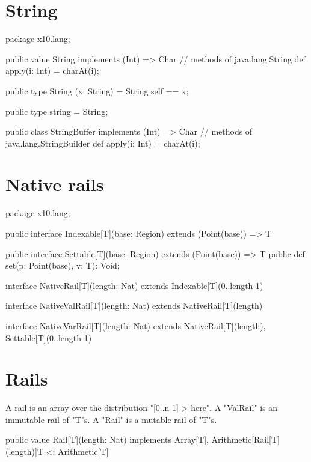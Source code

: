 \section{String}

\begin{xten}
package x10.lang;

public value String implements (Int) => Char {
    // methods of java.lang.String
    def apply(i: Int) = charAt(i);
}

public type String (x: String) = String {self == x};

public type string = String;

public class StringBuffer implements (Int) => Char {
    // methods of java.lang.StringBuilder
    def apply(i: Int) = charAt(i);
}
\end{xten}

\section{Native rails}

\begin{xten}
package x10.lang;

public interface Indexable[T](base: Region) extends (Point(base)) => T { } 

public interface Settable[T](base: Region) extends (Point(base)) => T {
    public def set(p: Point(base), v: T): Void;
} 

interface NativeRail[T](length: Nat) extends Indexable[T](0..length-1) { }

interface NativeValRail[T](length: Nat) extends NativeRail[T](length) { }

interface NativeVarRail[T](length: Nat) extends NativeRail[T](length),
    Settable[T](0..length-1) { }
\end{xten}

\section{Rails}


A rail is an array over the distribution \xcd"[0..n-1]-> here".
A \xcd"ValRail" is an immutable rail of \xcd"T"s.
A \xcd"Rail" is a mutable rail of \xcd"T"s.

\begin{xten}
public value Rail[T](length: Nat) 
    implements Array[T], Arithmetic[Rail[T](length)]{T <: Arithmetic[T]}
{
}
\end{xten}



